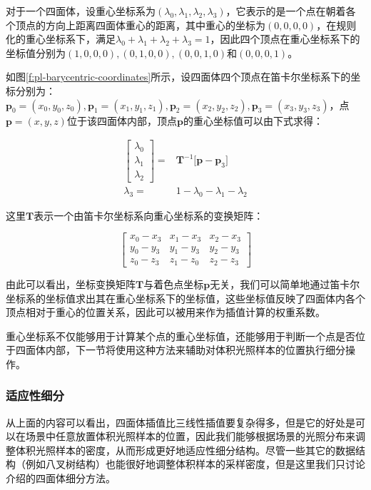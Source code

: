 对于一个四面体，设重心坐标系为$(\lambda_0, \lambda_1,\lambda_2,\lambda_3)$，它表示的是一个点在朝着各个顶点的方向上距离四面体重心的距离，其中重心的坐标为$(0,0,0,0)$，在规则化的重心坐标系下，满足$\lambda_0+ \lambda_1+\lambda_2+\lambda_3=1$，因此四个顶点在重心坐标系下的坐标值分别为$(1,0,0,0),(0,1,0,0),(0,0,1,0)$和$(0,0,0,1)$。

如图\ref{f:pl-barycentric-coordinates}所示，设四面体四个顶点在笛卡尔坐标系下的坐标分别为：$\mathbf{p}_0=(x_0,y_0,z_0),\mathbf{p}_1=(x_1,y_1,z_1),\mathbf{p}_2=(x_2,y_2,z_2),\mathbf{p}_3=(x_3,y_3,z_3)$，点$\mathbf{p}=(x,y,z)$位于该四面体内部，顶点$\mathbf{p}$的重心坐标值可以由下式求得：

\begin{equation}
\begin{aligned}
	\begin{bmatrix}
		\lambda_0 \\ \lambda_1 \\\lambda_2
	\end{bmatrix}=&\mathbf{T}^{-1}\bigg[ \mathbf{p}-\mathbf{p}_3\bigg]\\
	\lambda_3=&1-\lambda_0-\lambda_1-\lambda_2
\end{aligned}
\end{equation}

\noindent 这里$\mathbf{T}$表示一个由笛卡尔坐标系向重心坐标系的变换矩阵：

\begin{equation}
	\begin{bmatrix}
		x_0-x_3 & x_1-x_3 & x_2-x_3 \\
		y_0-y_3 & y_1-y_3 & y_2-y_3 \\
		z_0-z_3 & z_1-z_0 & z_2-z_3
	\end{bmatrix}
\end{equation}

由此可以看出，坐标变换矩阵$\mathbf{T}$与着色点坐标$\mathbf{p}$无关，我们可以简单地通过笛卡尔坐标系的坐标值求出其在重心坐标系下的坐标值，这些坐标值反映了四面体内各个顶点相对于重心的位置关系，因此可以被用来作为插值计算的权重系数。

重心坐标系不仅能够用于计算某个点的重心坐标值，还能够用于判断一个点是否位于四面体内部，下一节将使用这种方法来辅助对体积光照样本的位置执行细分操作。




\subsubsection{适应性细分}
从上面的内容可以看出，四面体插值比三线性插值要复杂得多，但是它的好处是可以在场景中任意放置体积光照样本的位置，因此我们能够根据场景的光照分布来调整体积光照样本的密度，从而形成更好地适应性细分结构。尽管一些其它的数据结构（例如八叉树结构）也能很好地调整体积样本的采样密度，但是这里我们只讨论\cite{a:Lightprobeinterpolationusingtetrahedraltessellations}介绍的四面体细分方法。

